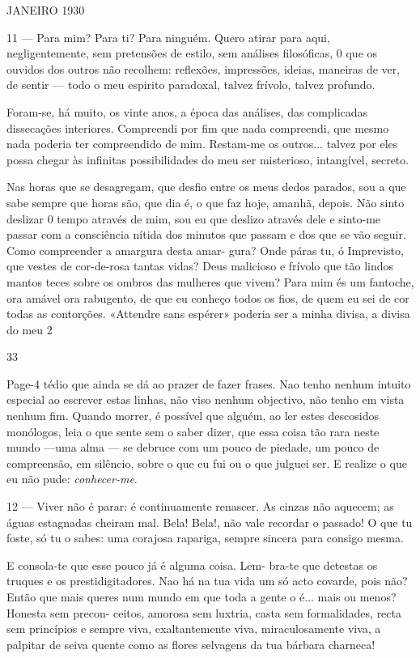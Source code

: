 
JANEIRO 1930

11 — Para mim? Para ti? Para ninguém. Quero atirar
para aqui, negligentemente, sem pretensões de estilo,
sem análises filosóficas, 0 que os ouvidos dos outros
não recolhem: reflexões, impressões, ideias, maneiras
de ver, de sentir — todo o meu espirito paradoxal,
talvez frívolo, talvez profundo.

Foram-se, há muito, os vinte anos, a época das análises,
das complicadas dissecações interiores. Compreendi por
fim que nada compreendi, que mesmo nada poderia ter
compreendido de mim. Restam-me os outros... talvez
por eles possa chegar às infinitas possibilidades do meu
ser misterioso, intangível, secreto.

Nas horas que se desagregam, que desfio entre os meus
dedos parados, sou a que sabe sempre que horas são,
que dia é, o que faz hoje, amanhã, depois. Não sinto
deslizar 0 tempo através de mim, sou eu que deslizo
através dele e sinto-me passar com a consciência
nítida dos minutos que passam e dos que se vão
seguir. Como compreender a amargura desta amar-
gura? Onde páras tu, ó Imprevisto, que vestes de
cor-de-rosa tantas vidas? Deus malicioso e frívolo que
tão lindos mantos teces sobre os ombros das mulheres
que vivem? Para mim és um fantoche, ora amável
ora rabugento, de que eu conheço todos os fios, de
quem eu sei de cor todas as contorções. «Attendre sans
espérer» poderia ser a minha divisa, a divisa do meu
2


33


Page-4
tédio que ainda se dá ao prazer de fazer frases.
Nao tenho nenhum intuito especial ao escrever estas
linhas, não viso nenhum objectivo, não tenho em vista
nenhum fim. Quando morrer, é possível que alguém,
ao ler estes descosidos monólogos, leia o que sente
sem o saber dizer, que essa coisa tão rara neste mundo
—uma alma — se debruce com um pouco de piedade,
um pouco de compreensão, em silêncio, sobre o que eu
fui ou o que julguei ser. E realize o que eu não pude:
\textit{conhecer-me}.

12 — Viver não é parar: é continuamente renascer.
As cinzas não aquecem; as águas estagnadas cheiram
mal. Bela! Bela!, não vale recordar o passado! O que
tu foste, só tu o sabes: uma corajosa rapariga, sempre
sincera para consigo mesma.

E consola-te que esse pouco já é alguma coisa. Lem-
bra-te que detestas os truques e os prestidigitadores.
Nao há na tua vida um só acto covarde, pois não?
Então que mais queres num mundo em que toda a
gente o é... mais ou menos? Honesta sem precon-
ceitos, amorosa sem luxtria, casta sem formalidades,
recta sem princípios e sempre viva, exaltantemente
viva, miraculosamente viva, a palpitar de seiva
quente como as flores selvagens da tua bárbara
charneca!

